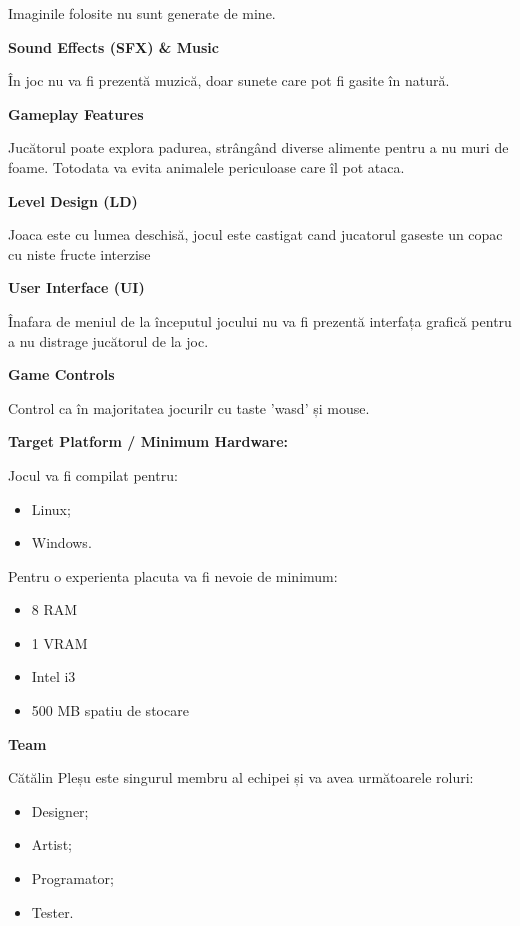 Imaginile folosite nu sunt generate de mine.

\vspace{5mm}
\noindent\textbf {Sound Effects (SFX) \& Music}

În joc nu va fi prezentă muzică, doar sunete care pot fi gasite în natură.

\vspace{5mm}
\noindent\textbf {Gameplay Features}

Jucătorul poate explora padurea, strângând diverse alimente pentru a nu muri de foame. Totodata va evita animalele periculoase care îl pot ataca.

\vspace{5mm}
\noindent\textbf {Level Design (LD)}

Joaca este cu lumea deschisă, jocul este castigat cand jucatorul gaseste un copac cu niste  fructe interzise

\vspace{5mm}
\noindent\textbf {User Interface (UI)}

Înafara de meniul de la începutul jocului nu va fi prezentă interfața grafică pentru a nu distrage jucătorul de la joc.

\vspace{5mm}
\noindent\textbf {Game Controls}

Control ca în majoritatea jocurilr cu taste 'wasd' și mouse.

\vspace{5mm}
\noindent\textbf {Target Platform / Minimum Hardware:}

Jocul va fi compilat pentru:
\begin{itemize}
    \item Linux;
    \item Windows.
\end{itemize}
Pentru o experienta placuta va fi nevoie de minimum:
\begin{itemize}
    \item 8 RAM
    \item 1 VRAM
    \item Intel i3
    \item 500 MB spatiu de stocare
\end{itemize}

\vspace{5mm}
\noindent\textbf {Team}

Cătălin Pleșu este singurul membru al echipei și va avea următoarele roluri:
\begin{itemize}
\item Designer;
\item Artist;
\item Programator;
\item Tester.
\end{itemize}

